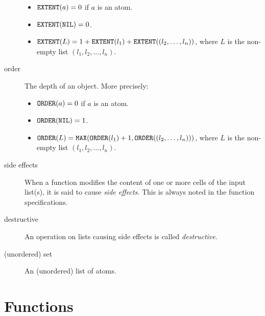 \begin{description}
  \begin{itemize}
  \item
    ${\tt EXTENT}(a) = 0$ if $a$ is an atom.
  \item
    ${\tt EXTENT}({\tt NIL}) = 0$.
  \item
    ${\tt EXTENT}(L) = 1 + {\tt EXTENT}(l_1) + {\tt EXTENT}((l_2,
    \ldots, l_n))$, where $L$ is the non-empty list $(l_1, l_2, \ldots, l_n)$.
  \end{itemize}
\item[order]
  The depth of an object. More precisely:
  \begin{itemize}
  \item
    ${\tt ORDER}(a) = 0$ if $a$ is an atom.
  \item
    ${\tt ORDER}({\tt NIL}) = 1$.
  \item
    ${\tt ORDER}(L) = {\tt MAX}({\tt ORDER}(l_1)+1, {\tt ORDER}((l_2, \ldots,
    l_n)))$, where $L$ is the non-empty list $(l_1, l_2, \ldots, l_n)$.
  \end{itemize}
\item[side effects]
  When a function modifies the content of one or more cells of the input
  list(s), it is said to cause {\em side effects}. This is always noted
  in the function specifications.
\item[destructive]
  An operation on lists causing side effects is called {\em destructive}.
\item[(unordered) set]
  An (unordered) list of atoms.
\end{description}


\section{Functions}
\label{c:LP s:F}

